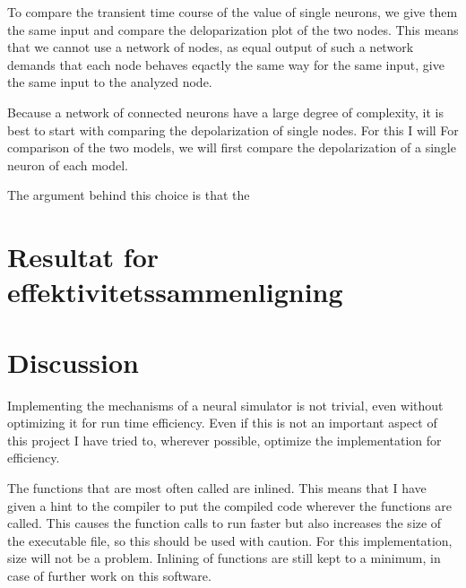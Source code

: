 To compare the transient time course of the value of single neurons, we give them the same input and compare the deloparization plot of the two nodes.
This means that we cannot use a network of nodes, as equal output of such a network demands that each node behaves eqactly the same way for the same input, give the same input to the analyzed node.




Because a network of connected neurons have a large degree of complexity, it is best to start with comparing the depolarization of single nodes.
For this I will 
For comparison of the two models, we will first compare the depolarization of a single neuron of each model.

The argument behind this choice is that the 


\section{Resultat for effektivitetssammenligning}





\section{Discussion}

Implementing the mechanisms of a neural simulator is not trivial, even without optimizing it for run time efficiency.
Even if this is not an important aspect of this project I have tried to, wherever possible, optimize the implementation for efficiency.

The functions that are most often called are inlined. This means that I have given a hint to the compiler to put the compiled code wherever the functions are called.
This causes the function calls to run faster but also increases the size of the executable file, so this should be used with caution. %
For this implementation, size will not be a problem. %
Inlining of functions are still kept to a minimum, in case of further work on this software. %

